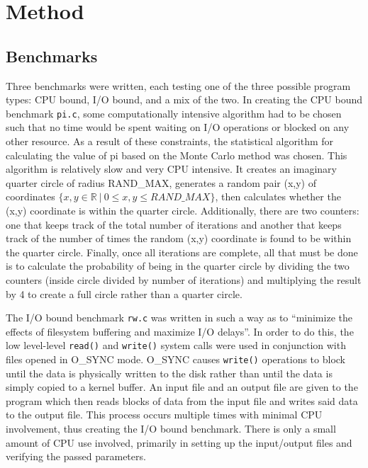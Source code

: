 ﻿\section{Method}

\subsection{Benchmarks}

Three benchmarks were written, each testing one of the three possible program types: CPU bound, I/O bound, and a mix of the two.  In creating the CPU bound benchmark \texttt{pi.c}, some computationally intensive algorithm had to be chosen such that no time would be spent waiting on I/O operations or blocked on any other resource.  As a result of these constraints, the statistical algorithm for calculating the value of pi based on the Monte Carlo method was chosen\cite{sayler-pi}.  This algorithm is relatively slow and very CPU intensive.  It creates an imaginary quarter circle of radius RAND\_MAX, generates a random pair (x,y) of coordinates $\{x,y \in \mathbb{R}\ |\ 0 \le x,y \le RAND\_MAX\}$, then calculates whether the (x,y) coordinate is within the quarter circle.  Additionally, there are two counters: one that keeps track of the total number of iterations and another that keeps track of the number of times the random (x,y) coordinate is found to be within the quarter circle.  Finally, once all iterations are complete, all that must be done is to calculate the probability of being in the quarter circle by dividing the two counters (inside circle divided by number of iterations) and multiplying the result by 4 to create a full circle rather than a quarter circle.

The I/O bound benchmark \texttt{rw.c} was written in such a way as to ``minimize the effects of filesystem buffering and maximize I/O delays''\cite{sayler-pdf}.  In order to do this, the low level-level \texttt{read()} and \texttt{write()} system calls were used in conjunction with files opened in O\_SYNC mode.  O\_SYNC causes \texttt{write()} operations to block until the data is physically written to the disk rather than until the data is simply copied to a kernel buffer\cite{man-open}.  An input file and an output file are given to the program which then reads blocks of data from the input file and writes said data to the output file.  This process occurs multiple times with minimal CPU involvement, thus creating the I/O bound benchmark.  There is only a small amount of CPU use involved, primarily in setting up the input/output files and verifying the passed parameters.

